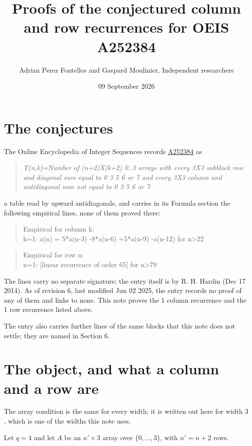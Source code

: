 \documentclass[11pt]{article}
\title{Proofs of the conjectured column and row recurrences for OEIS A252384}
\author{Adrian Perez Fontelles and Gaspard Moulinier, Independent researchers}
\date{09 September 2026}
\theoremstyle{definition}
\begin{document}
\maketitle
\section{The conjectures}

The Online Encyclopedia of Integer Sequences records \href{https://oeis.org/A252384}{A252384} as

\begin{quote}\itshape T(n,k)=Number of (n+2)X(k+2) 0..3 arrays with every 3X3 subblock row and diagonal sum equal to 0 3 5 6 or 7 and every 3X3 column and antidiagonal sum not equal to 0 3 5 6 or 7\end{quote}

a table read by upward antidiagonals, and carries in its Formula section the following empirical lines, none of them proved there:

\begin{quote}\ttfamily Empirical for column k:\\
k=1: a(n) = 5*a(n-3) -8*a(n-6) +5*a(n-9) -a(n-12) for n>22\end{quote}

\begin{quote}\ttfamily Empirical for row n:\\
n=1: [linear recurrence of order 65] for n>79\end{quote}

The lines carry no separate signature; the entry itself is by R. H. Hardin (Dec 17 2014). As of revision 6, last modified Jun 02 2025, the entry records no proof of any of them and links to none. This note proves the 1 column recurrence and the 1 row recurrence listed above.

The entry also carries further lines of the same blocks that this note does not settle; they are named in Section 6.

\section{The object, and what a column and a row are}

The array condition is the same for every width; it is written out here for width $3$, which is one of the widths this note uses.

Let $q = 4$ and let $A$ be an $n' \times 3$ array over $\{0,\dots,3\}$, with $n' = n + 2$ rows.
\end{document}
